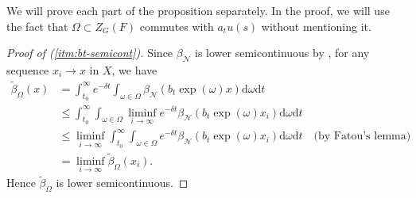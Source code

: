 \documentclass[12pt,reqno]{amsart}
\numberwithin{equation}{section}
\theoremstyle{plain}
\theoremstyle{definition}
\theoremstyle{remark}
\newcommand\cN{\mathcal{N}}
\newcommand{\de}{\mathrm{d}}
\newcommand{\btt}{\widetilde{\beta}_\Omega}
\newcommand{\bN}{\beta_\cN}
\begin{document}
    We will prove each part of the proposition separately. In the proof, we will use the fact that $\Omega\subset Z_G(F)$ commutes with $a_tu(s)$ without mentioning it.
    
\begin{proof}[Proof of (\ref{itm:bt-semicont})] Since $\bN$ is lower semicontinuous by , for any sequence $x_i\to x$ in $X$, we have
\[
\begin{split}
\btt(x) &= \int_{t_0}^\infty e^{-\delta t}\int_{\omega\in\Omega} \bN(b_t\exp(\omega) x)\de\omega\de t \\
&\leq \int_{t_0}^\infty \int_{\omega\in\Omega} \liminf_{i\to\infty} e^{-\delta t}\bN(b_t\exp(\omega) x_i)\de\omega\de t \\
&\leq \liminf_{i\to\infty} \int_{t_0}^\infty \int_{\omega\in\Omega} e^{-\delta t}\bN(b_t\exp(\omega) x_i)\de\omega\de t \quad \text{(by Fatou's lemma)}\\
&= \liminf_{i\to\infty} \btt(x_i).
\end{split}
\]
Hence $\btt$ is lower semicontinuous.
\end{proof}
\end{document}
